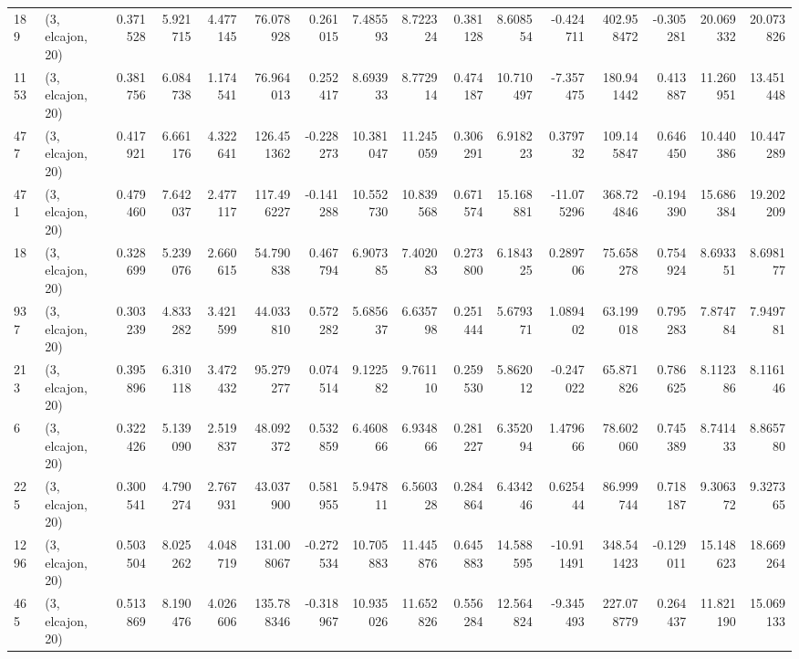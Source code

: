 \begin{tabular}{llrrrrrrrrrrrrrr}
189  &  (3, elcajon, 20) &   0.371528 &   5.921715 &   4.477145 &     76.078928 &    0.261015 &    7.485593 &    8.722324 &  0.381128 &   8.608554 &  -0.424711 &   402.958472 &  -0.305281 &  20.069332 &  20.073826 \\
1153 &  (3, elcajon, 20) &   0.381756 &   6.084738 &   1.174541 &     76.964013 &    0.252417 &    8.693933 &    8.772914 &  0.474187 &  10.710497 &  -7.357475 &   180.941442 &   0.413887 &  11.260951 &  13.451448 \\
477  &  (3, elcajon, 20) &   0.417921 &   6.661176 &   4.322641 &    126.451362 &   -0.228273 &   10.381047 &   11.245059 &  0.306291 &   6.918223 &   0.379732 &   109.145847 &   0.646450 &  10.440386 &  10.447289 \\
471  &  (3, elcajon, 20) &   0.479460 &   7.642037 &   2.477117 &    117.496227 &   -0.141288 &   10.552730 &   10.839568 &  0.671574 &  15.168881 & -11.075296 &   368.724846 &  -0.194390 &  15.686384 &  19.202209 \\
18   &  (3, elcajon, 20) &   0.328699 &   5.239076 &   2.660615 &     54.790838 &    0.467794 &    6.907385 &    7.402083 &  0.273800 &   6.184325 &   0.289706 &    75.658278 &   0.754924 &   8.693351 &   8.698177 \\
937  &  (3, elcajon, 20) &   0.303239 &   4.833282 &   3.421599 &     44.033810 &    0.572282 &    5.685637 &    6.635798 &  0.251444 &   5.679371 &   1.089402 &    63.199018 &   0.795283 &   7.874784 &   7.949781 \\
213  &  (3, elcajon, 20) &   0.395896 &   6.310118 &   3.472432 &     95.279277 &    0.074514 &    9.122582 &    9.761110 &  0.259530 &   5.862012 &  -0.247022 &    65.871826 &   0.786625 &   8.112386 &   8.116146 \\
6    &  (3, elcajon, 20) &   0.322426 &   5.139090 &   2.519837 &     48.092372 &    0.532859 &    6.460866 &    6.934866 &  0.281227 &   6.352094 &   1.479666 &    78.602060 &   0.745389 &   8.741433 &   8.865780 \\
225  &  (3, elcajon, 20) &   0.300541 &   4.790274 &   2.767931 &     43.037900 &    0.581955 &    5.947811 &    6.560328 &  0.284864 &   6.434246 &   0.625444 &    86.999744 &   0.718187 &   9.306372 &   9.327365 \\
1296 &  (3, elcajon, 20) &   0.503504 &   8.025262 &   4.048719 &    131.008067 &   -0.272534 &   10.705883 &   11.445876 &  0.645883 &  14.588595 & -10.911491 &   348.541423 &  -0.129011 &  15.148623 &  18.669264 \\
465  &  (3, elcajon, 20) &   0.513869 &   8.190476 &   4.026606 &    135.788346 &   -0.318967 &   10.935026 &   11.652826 &  0.556284 &  12.564824 &  -9.345493 &   227.078779 &   0.264437 &  11.821190 &  15.069133 \\

\end{tabular}
